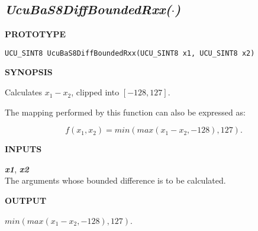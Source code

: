 \subsection[\emph{UcuBaS8DiffBoundedRxx(\protect\mbox{\protect$\cdot$})}]
           {\emph{UcuBaS8DiffBoundedRxx(\protect\mbox{\protect\boldmath $\cdot$})}}
\label{cbaf0:sscf0:sfss0}

%

\noindent\textbf{PROTOTYPE}
\begin {list}{}{\setlength{\leftmargin}{0.25in}\setlength{\topsep}{0.0in}}
\item
\begin{verbatim}
UCU_SINT8 UcuBaS8DiffBoundedRxx(UCU_SINT8 x1, UCU_SINT8 x2)
\end{verbatim}
\end{list}
\vspace{2.8ex}

\noindent\textbf{SYNOPSIS}
\begin{list}{}{\setlength{\leftmargin}{0.25in}\setlength{\topsep}{0.0in}}
\item Calculates $x_1-x_2$, clipped into $[-128, 127]$.
\item The mapping performed by this function can also be expressed as:

      \begin{equation}
      \label{eq:cbaf0:sscf0:sfss0:01}
      f(x_1, x_2) = min(max(x_1 - x_2, -128), 127) .
      \end{equation}
\end{list}
\vspace{2.8ex}

\noindent\textbf{INPUTS}
\begin{list}{}{\setlength{\leftmargin}{0.5in}\setlength{\itemindent}{-0.25in}\setlength{\topsep}{0.0in}\setlength{\partopsep}{0.0in}}
\item \emph{\textbf{x1}}, \emph{\textbf{x2}}\\
      The arguments whose bounded difference is to be calculated.
\end{list}
\vspace{2.8ex}

\noindent\textbf{OUTPUT}
\begin{list}{}{\setlength{\leftmargin}{0.25in}\setlength{\topsep}{0.0in}}
\item $min(max(x_1 - x_2, -128), 127)$.
\end{list}
\vspace{2.8ex}

